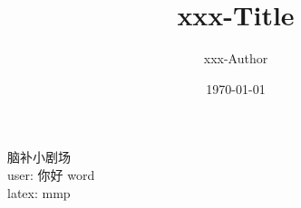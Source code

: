 \documentclass[UTF8]{ctexart}
\title{xxx-Title}
\author{xxx-Author}
\date{\today}
\begin{document}
\maketitle
脑补小剧场\\
user: 你好 word\\
latex: mmp
\end{document}

